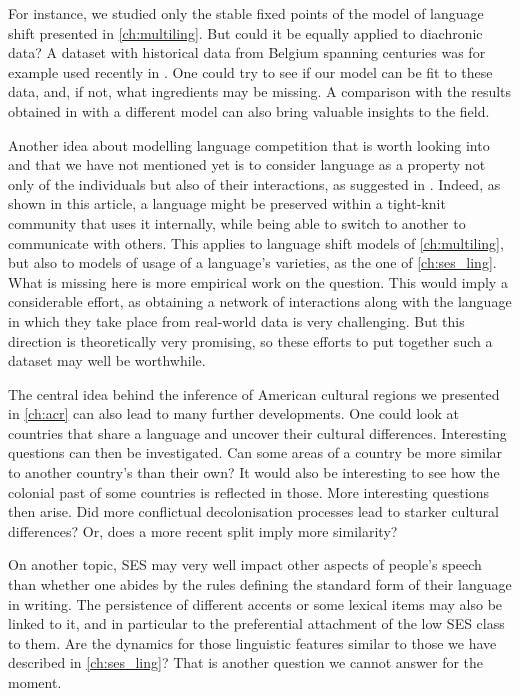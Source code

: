 \documentclass[../thesis.tex]{subfiles}
\begin{document}
For instance, we studied only the stable fixed points of the model of language shift
presented in \cref{ch:multiling}. But could it be equally applied to diachronic data? A
dataset with historical data from Belgium spanning centuries was for example used
recently in \cite{SeoaneAreDutch2022}. One could try to see if our model can be fit to
these data, and, if not, what ingredients may be missing. A comparison with the results
obtained in \cite{SeoaneAreDutch2022} with a different model can also bring valuable
insights to the field. 

Another idea about modelling language competition that is worth looking into and that we
have not mentioned yet is to consider language as a property not only of the individuals
but also of their interactions, as suggested in \cite{CarroCoupledDynamics2016}. Indeed,
as shown in this article, a language might be preserved within a tight-knit community
that uses it internally, while being able to switch to another to communicate with
others. This applies to language shift models of \cref{ch:multiling}, but also to models
of usage of a language's varieties, as the one of \cref{ch:ses_ling}. What is missing
here is more empirical work on the question. This would imply a considerable effort, as
obtaining a network of interactions along with the language in which they take place
from real-world data is very challenging. But this direction is theoretically very
promising, so these efforts to put together such a dataset may well be worthwhile.

The central idea behind the inference of American cultural regions we presented in
\cref{ch:acr} can also lead to many further developments. One could look at countries
that share a language and uncover their cultural differences. Interesting questions can
then be investigated. Can some areas of a country be more similar to another country's
than their own? It would also be interesting to see how the colonial past of some
countries is reflected in those. More interesting questions then arise. Did more
conflictual decolonisation processes lead to starker cultural differences? Or, does a
more recent split imply more similarity?

On another topic, \ac{SES} may very well impact other aspects of people's speech than
whether one abides by the rules defining the standard form of their language in writing.
The persistence of different accents or some lexical items may also be linked to it, and
in particular to the preferential attachment of the low \ac{SES} class to them. Are the
dynamics for those linguistic features similar to those we have described in
\cref{ch:ses_ling}? That is another question we cannot answer for the moment.
\end{document}
